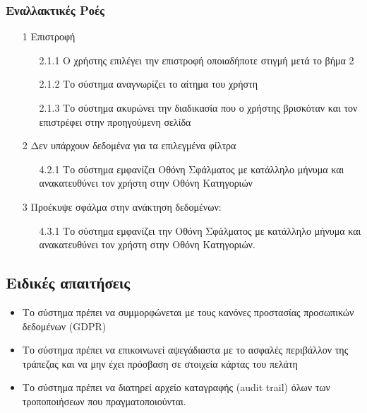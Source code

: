 \documentclass[12pt,a4paper,twoside]{book}
\begin{document}
\subsubsection{Εναλλακτικές Ροές}
\begin{enumerate}
  \item[1 ] Επιστροφή
        \begin{enumerate}
          \item[2.1.1 ] Ο χρήστης επιλέγει την επιστροφή οποιαδήποτε στιγμή μετά το βήμα 2 %
          \item[2.1.2 ] Το σύστημα αναγνωρίζει το αίτημα του χρήστη %
          \item[2.1.3 ] Το σύστημα ακυρώνει την διαδικασία που ο χρήστης βρισκόταν και τον επιστρέφει στην προηγούμενη σελίδα %
        \end{enumerate}
  \item[2 ] Δεν υπάρχουν δεδομένα για τα επιλεγμένα φίλτρα %
        \begin{enumerate}
          \item[4.2.1 ] Το σύστημα εμφανίζει Οθόνη Σφάλματος με κατάλληλο μήνυμα και ανακατευθύνει τον χρήστη στην Οθόνη Κατηγοριών
        \end{enumerate}
  \item[3 ] Προέκυψε σφάλμα στην ανάκτηση δεδομένων: %
        \begin{enumerate}
          \item[4.3.1 ] Το σύστημα εμφανίζει την Οθόνη Σφάλματος με κατάλληλο μήνυμα και ανακατευθύνει τον χρήστη στην Οθόνη Κατηγοριών.
        \end{enumerate}
\end{enumerate}

\subsection{Ειδικές απαιτήσεις} %
\begin{itemize}
  \item Το σύστημα πρέπει να συμμορφώνεται με τους κανόνες προστασίας προσωπικών δεδομένων (GDPR)  %
  \item Το σύστημα πρέπει να επικοινωνεί αψεγάδιαστα με το ασφαλές περιβάλλον της τράπεζας και να μην έχει πρόσβαση σε στοιχεία κάρτας του πελάτη   %
  \item Το σύστημα πρέπει να διατηρεί αρχείο καταγραφής (audit trail) όλων των τροποποιήσεων που πραγματοποιούνται. %
\end{itemize}
\end{document}
